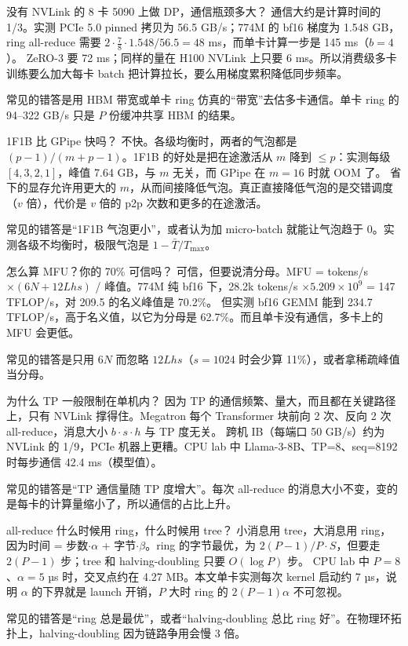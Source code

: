 \documentclass[11pt,a4paper]{ctexart}
\begin{document}
\begin{iqbox}{没有 NVLink 的 8 卡 5090 上做 DP，通信瓶颈多大？}
通信大约是计算时间的 1/3。实测 PCIe 5.0 pinned 拷贝为 56.5 GB/s；774M 的 bf16 梯度为 1.548 GB，ring all-reduce 需要 $2\cdot\frac78\cdot1.548/56.5=48$ ms，而单卡计算一步是 145 ms（$b=4$）。
ZeRO-3 要 72 ms；同样的量在 H100 NVLink 上只要 6 ms。所以消费级多卡训练要么加大每卡 batch 把计算拉长，要么用梯度累积降低同步频率。
\par 常见的错答是用 HBM 带宽或单卡 ring 仿真的“带宽”去估多卡通信。单卡 ring 的 94--322 GB/s 只是 $P$ 份缓冲共享 HBM 的结果。
\end{iqbox}

\begin{iqbox}{1F1B 比 GPipe 快吗？}
不快。各级均衡时，两者的气泡都是 $(p-1)/(m+p-1)$。1F1B 的好处是把在途激活从 $m$ 降到 $\le p$：实测每级 $[4,3,2,1]$，峰值 7.64 GB，与 $m$ 无关，而 GPipe 在 $m=16$ 时就 OOM 了。
省下的显存允许用更大的 $m$，从而间接降低气泡。真正直接降低气泡的是交错调度（$v$ 倍），代价是 $v$ 倍的 p2p 次数和更多的在途激活。
\par 常见的错答是“1F1B 气泡更小”，或者认为加 micro-batch 就能让气泡趋于 0。实测各级不均衡时，极限气泡是 $1-\bar T/T_{\max}$。
\end{iqbox}

\begin{iqbox}{怎么算 MFU？你的 70\% 可信吗？}
可信，但要说清分母。MFU = tokens/s $\times(6N+12Lhs)$ / 峰值。774M 纯 bf16 下，28.2k tokens/s $\times5.209\times10^9$ = 147 TFLOP/s，对 209.5 的名义峰值是 70.2\%。
但实测 bf16 GEMM 能到 234.7 TFLOP/s，高于名义值，以它为分母是 62.7\%。而且单卡没有通信，多卡上的 MFU 会更低。
\par 常见的错答是只用 $6N$ 而忽略 $12Lhs$（$s=1024$ 时会少算 11\%），或者拿稀疏峰值当分母。
\end{iqbox}

\begin{iqbox}{为什么 TP 一般限制在单机内？}
因为 TP 的通信频繁、量大，而且都在关键路径上，只有 NVLink 撑得住。Megatron 每个 Transformer 块前向 2 次、反向 2 次 all-reduce，消息大小 $b\cdot s\cdot h$ 与 TP 度无关。
跨机 IB（每端口 50 GB/s）约为 NVLink 的 1/9，PCIe 机器上更糟。CPU lab 中 Llama-3-8B、TP=8、seq=8192 时每步通信 42.4 ms（模型值）。
\par 常见的错答是“TP 通信量随 TP 度增大”。每次 all-reduce 的消息大小不变，变的是每卡的计算量缩小了，所以通信的占比上升。
\end{iqbox}

\begin{iqbox}{all-reduce 什么时候用 ring，什么时候用 tree？}
小消息用 tree，大消息用 ring，因为时间 = 步数$\cdot\alpha$ + 字节$\cdot\beta$。ring 的字节最优，为 $2(P-1)/P\cdot S$，但要走 $2(P-1)$ 步；tree 和 halving-doubling 只要 $O(\log P)$ 步。
CPU lab 中 $P=8$、$\alpha=5$ µs 时，交叉点约在 4.27 MB。本文单卡实测每次 kernel 启动约 7 µs，说明 $\alpha$ 的下界就是 launch 开销，$P$ 大时 ring 的 $2(P-1)\alpha$ 不可忽视。
\par 常见的错答是“ring 总是最优”，或者“halving-doubling 总比 ring 好”。在物理环拓扑上，halving-doubling 因为链路争用会慢 3 倍。
\end{iqbox}
\end{document}
